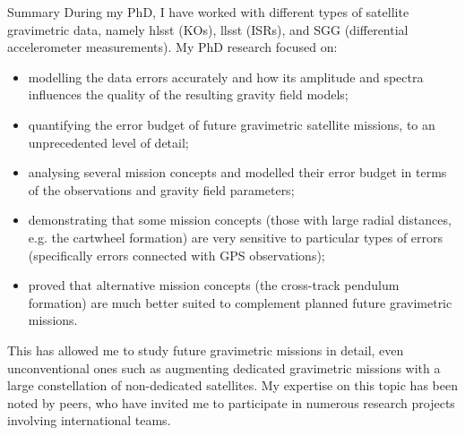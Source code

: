 \begin{cvtext}{Summary}
During my PhD, I have worked with different types of satellite gravimetric data, namely \acl{hlsst} (\aclp{KO}), \acl{llsst} (\aclp{ISR}), and \acl{SGG} (differential accelerometer measurements).
My PhD research focused on:
\begin{itemize}[topsep=0pt,itemsep=1pt,parsep=0pt,partopsep=0pt]
\item modelling the data errors accurately and how its amplitude and spectra influences the quality of the resulting gravity field models;
\item quantifying the error budget of future gravimetric satellite missions, to an unprecedented level of detail;
\item analysing several mission concepts and modelled their error budget in terms of the observations and gravity field parameters;
\item demonstrating that some mission concepts (those with large radial distances, \acs{e.g.} the cartwheel formation) are very sensitive to particular types of errors (specifically errors connected with \ac{GPS} observations); %
\item proved that alternative mission concepts (the cross-track pendulum formation) are much better suited to complement planned future gravimetric missions.%
\end{itemize}
This has allowed me to study future gravimetric missions in detail, even unconventional ones such as augmenting dedicated gravimetric missions with a large constellation of non-dedicated satellites.
My expertise on this topic has been noted by peers, who have invited me to participate in numerous research projects involving international teams.




\end{cvtext}
